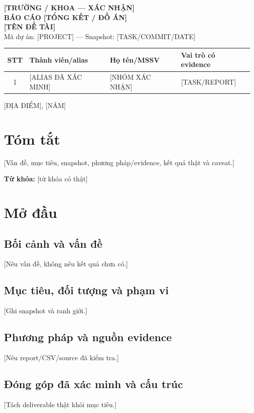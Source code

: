 \begin{titlepage}
\thispagestyle{empty}
\begin{center}
\vspace*{1.4cm}
{\Large\bfseries [TRƯỜNG / KHOA — XÁC NHẬN]}\\[1.2cm]
{\Large\bfseries BÁO CÁO [TỔNG KẾT / ĐỒ ÁN]}\\[0.5cm]
{\LARGE\bfseries [TÊN ĐỀ TÀI]}\\[0.6cm]
Mã dự án: [PROJECT] — Snapshot: [TASK/COMMIT/DATE]
\vfill
\begin{tabularx}{\textwidth}{c p{} p{} X}
\toprule STT & Thành viên/alias & Họ tên/MSSV & Vai trò có evidence \\
\midrule
1 & [ALIAS ĐÃ XÁC MINH] & [NHÓM XÁC NHẬN] & [TASK/REPORT] \\
\bottomrule
\end{tabularx}
\vfill
[ĐỊA ĐIỂM], [NĂM]
\end{center}
\end{titlepage}

\chapter*{Tóm tắt}
[Vấn đề, mục tiêu, snapshot, phương pháp/evidence, kết quả thật và caveat.]

\noindent\textbf{Từ khóa:} [từ khóa có thật]

\chapter*{Mở đầu}
\section*{Bối cảnh và vấn đề}
[Nêu vấn đề, không nêu kết quả chưa có.]
\section*{Mục tiêu, đối tượng và phạm vi}
[Ghi snapshot và ranh giới.]
\section*{Phương pháp và nguồn evidence}
[Nêu report/CSV/source đã kiểm tra.]
\section*{Đóng góp đã xác minh và cấu trúc}
[Tách deliverable thật khỏi mục tiêu.]
